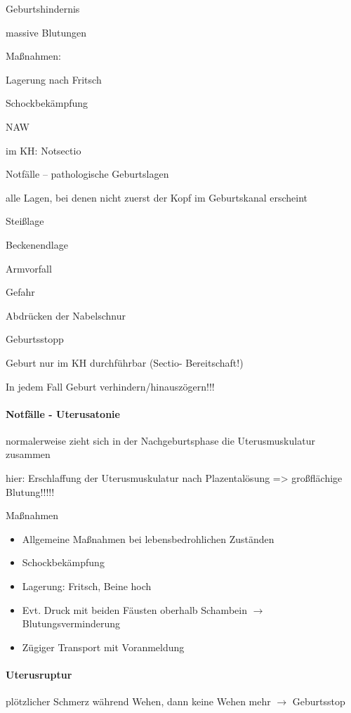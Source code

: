 \documentclass{article}
\begin{document}
Geburtshindernis

massive Blutungen

Ma{\ss}nahmen:

Lagerung nach Fritsch

Schockbek\"ampfung

NAW

im KH: Notsectio

Notf\"alle -- pathologische  Geburtslagen

alle Lagen, bei denen nicht zuerst der  Kopf im Geburtskanal erscheint 

Stei{\ss}lage

Beckenendlage

Armvorfall

Gefahr

Abdr\"ucken der Nabelschnur

Geburtsstopp

Geburt nur im KH durchf\"uhrbar (Sectio- Bereitschaft!)

In jedem Fall Geburt  verhindern/hinausz\"ogern!!!

\paragraph{Notf\"alle - Uterusatonie}
normalerweise zieht sich in der  Nachgeburtsphase die Uterusmuskulatur 
zusammen

hier: Erschlaffung der Uterusmuskulatur  nach Plazental\"osung
={\textgreater} gro{\ss}fl\"achige  Blutung!!!!!

Ma{\ss}nahmen

\begin{itemize}
\item Allgemeine Ma{\ss}nahmen bei lebensbedrohlichen Zust\"anden

\item Schockbek\"ampfung

\item Lagerung: Fritsch, Beine hoch

\item Evt. Druck mit beiden F\"austen oberhalb  Schambein
${\rightarrow}$ Blutungsverminderung

\item Z\"ugiger Transport mit Voranmeldung

\end{itemize}
\paragraph{Uterusruptur}
pl\"otzlicher Schmerz w\"ahrend Wehen,  dann keine Wehen mehr
${\rightarrow}$ Geburtsstop
\end{document}

